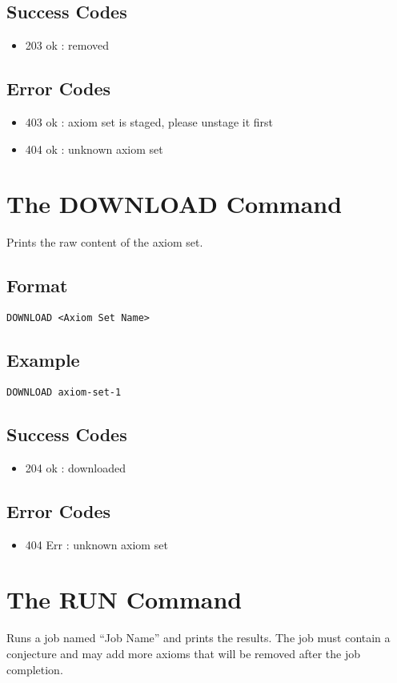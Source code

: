 \subsection{Success Codes}
\begin{itemize}
    \item 203 ok : removed
\end{itemize}
\subsection{Error Codes}
\begin{itemize}
    \item 403 ok : axiom set is staged, please unstage it first
    \item 404 ok : unknown axiom set
\end{itemize}
\clearpage

\section{The DOWNLOAD Command}
Prints the raw content of the axiom set.
\subsection{Format}
\begin{lstlisting}
DOWNLOAD <Axiom Set Name>
\end{lstlisting}
\subsection{Example}
\begin{lstlisting}
DOWNLOAD axiom-set-1
\end{lstlisting}
\subsection{Success Codes}
\begin{itemize}
    \item 204 ok : downloaded
\end{itemize}
\subsection{Error Codes}
\begin{itemize}
    \item 404 Err : unknown axiom set
\end{itemize}
\clearpage

\section{The RUN Command}
Runs a job named ``Job Name'' and prints the results. The job must contain a conjecture and may add more axioms that will be removed after the job completion.

